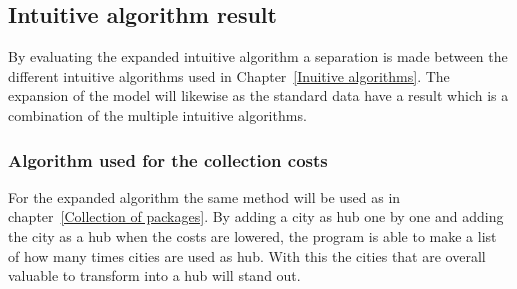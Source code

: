 \documentclass{article}
\begin{document}
    \subsection{Intuitive algorithm result}
    
        By evaluating the expanded intuitive algorithm a separation is made between the different intuitive algorithms used in Chapter~\ref{Inuitive algorithms}. The expansion of the model will likewise as the standard data have a result which is a combination of the multiple intuitive algorithms. 


        \subsubsection{Algorithm used for the collection costs}
            For the expanded algorithm the same method will be used as in chapter~\ref{Collection of packages}. By adding a city as hub one by one and adding the city as a hub when the costs are lowered, the program is able to make a list of how many times cities are used as hub. With this the cities that are overall valuable to transform into a hub will stand out.
            
\end{document}

